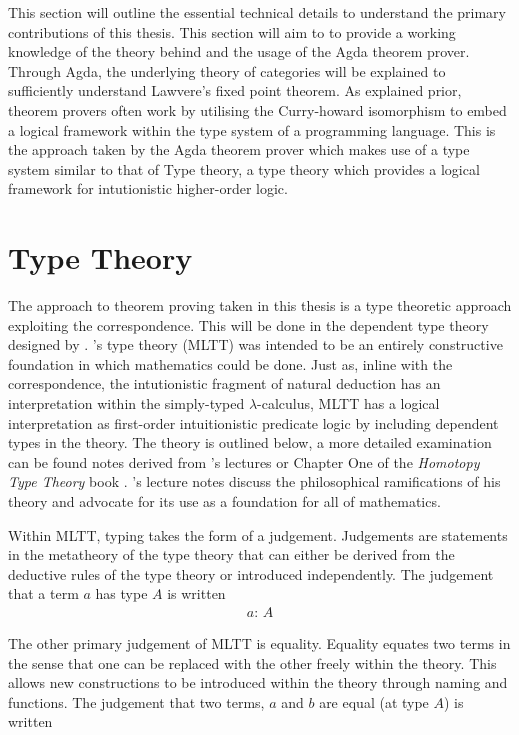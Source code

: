 This section will outline the essential technical details to understand the
primary contributions of this thesis. This section will aim to to provide a
working knowledge of the theory behind and the usage of the Agda theorem prover.
Through Agda, the underlying theory of categories will be explained to
sufficiently understand Lawvere's fixed point theorem. As explained prior,
theorem provers often work by utilising the Curry-howard isomorphism to embed a
logical framework within the type system of a programming language. This is the
approach taken by the Agda theorem prover which makes use of a type system
similar to that of \mlt{} Type theory, a type theory which provides a
logical framework for intutionistic higher-order logic.

\section{\mlt{} Type Theory}
\label{section:mlt}
The approach to theorem proving taken in this thesis is a type theoretic
approach exploiting the \cuho{} correspondence. This will be done in the
dependent type theory designed by \mlt{}. \mlt{}'s type theory (MLTT) was intended to be an
entirely constructive foundation in which mathematics could be done. Just as,
inline with the \cuho{} correspondence, the intutionistic fragment of
natural deduction has an interpretation within the simply-typed
$\lambda$-calculus, MLTT has a logical interpretation as first-order
intuitionistic predicate logic by including dependent types in the theory. The
theory is outlined below, a more detailed examination can be found notes derived
from \mlt's lectures \cite{martin1984intuitionistic} or Chapter One of the
\textit{Homotopy Type Theory} book \cite{hottbook}. \mlt's lecture notes
discuss the philosophical ramifications of his theory and advocate for its use
as a foundation for all of mathematics.

Within MLTT, typing takes the form of a judgement. Judgements are statements in
the metatheory of the type theory that can either be derived from the deductive
rules of the type theory or introduced independently. The judgement that a term
$a$ has type $A$ is written
\begin{align*}
    a: \, A
\end{align*}

The other primary judgement of MLTT is equality. Equality equates
two terms in the sense that one can be replaced with the other freely within the
theory. This allows new constructions to be introduced within the theory through
naming and functions. The judgement that
two terms, $a$ and $b$ are equal (at type $A$) is written

